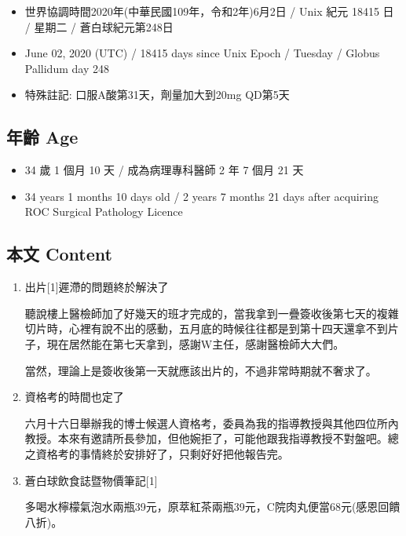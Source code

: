 \documentclass[a5paper, 11pt
]{book}
\providecommand{\tightlist}{%
  \setlength{\itemsep}{0pt}\setlength{\parskip}{0pt}}
\begin{document}
\begin{itemize}
\tightlist
\item
  世界協調時間2020年(中華民國109年，令和2年)6月2日 / Unix 紀元 18415 日
  / 星期二 / 蒼白球紀元第248日
\item
  June 02, 2020 (UTC) / 18415 days since Unix Epoch / Tuesday / Globus
  Pallidum day 248
\item
  特殊註記: 口服A酸第31天，劑量加大到20mg QD第5天
\end{itemize}

\hypertarget{ux5e74ux9f61-age-1}{%
\subsection{年齡 Age}\label{ux5e74ux9f61-age-1}}

\begin{itemize}
\tightlist
\item
  34 歲 1 個月 10 天 / 成為病理專科醫師 2 年 7 個月 21 天
\item
  34 years 1 months 10 days old / 2 years 7 months 21 days after
  acquiring ROC Surgical Pathology Licence
\end{itemize}

\hypertarget{ux672cux6587-content-1}{%
\subsection{本文 Content}\label{ux672cux6587-content-1}}

\begin{enumerate}
\def\labelenumi{\arabic{enumi}.}
\item
  出片{[}1{]}遲滯的問題終於解決了

  聽說樓上醫檢師加了好幾天的班才完成的，當我拿到一疊簽收後第七天的複雜切片時，心裡有說不出的感動，五月底的時候往往都是到第十四天還拿不到片子，現在居然能在第七天拿到，感謝W主任，感謝醫檢師大大們。

  當然，理論上是簽收後第一天就應該出片的，不過非常時期就不奢求了。
\item
  資格考的時間也定了

  六月十六日舉辦我的博士候選人資格考，委員為我的指導教授與其他四位所內教授。本來有邀請所長參加，但他婉拒了，可能他跟我指導教授不對盤吧。總之資格考的事情終於安排好了，只剩好好把他報告完。
\item
  蒼白球飲食誌暨物價筆記{[}1{]}

  多喝水檸檬氣泡水兩瓶39元，原萃紅茶兩瓶39元，C院肉丸便當68元(感恩回饋八折)。
\end{enumerate}
\end{document}
